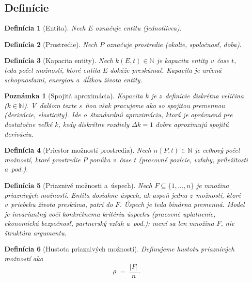 \documentclass[12pt,a4paper]{article}
\newtheorem{definition}{Definícia}[section]
\newtheorem{remark}{Poznámka}[section]
\begin{document}
\subsection{Definície}

\begin{definition}[Entita]
Nech $E$ označuje entitu (jednotlivca).
\end{definition}

\begin{definition}[Prostredie]
Nech $P$ označuje prostredie (okolie, spoločnosť, doba).
\end{definition}

\begin{definition}[Kapacita entity]
Nech $k(E, t) \in \mathbb{N}$ je \emph{kapacita entity} v~čase $t$, teda počet možností, ktoré entita $E$ dokáže preskúmať. Kapacita je určená schopnosťami, energiou a~dĺžkou života entity.
\end{definition}

\begin{remark}[Spojitá aproximácia]
Kapacita $k$ je z~definície diskrétna veličina ($k \in \mathbb{N}$). V~ďalšom texte s~ňou však pracujeme ako so spojitou premennou (derivácie, elasticity). Ide o~štandardnú aproximáciu, ktorá je oprávnená pre dostatočne veľké $k$, kedy diskrétne rozdiely $\Delta k = 1$ dobre aproximujú spojitú deriváciu.
\end{remark}

\begin{definition}[Priestor možností prostredia]
Nech $n(P, t) \in \mathbb{N}$ je celkový počet možností, ktoré prostredie $P$ ponúka v~čase $t$ (pracovné pozície, vzťahy, príležitosti a~pod.).
\end{definition}

\begin{definition}[Priaznivé možnosti a~úspech]
Nech $F \subseteq \{1, \dots, n\}$ je množina \emph{priaznivých možností}. Entita dosiahne \emph{úspech}, ak aspoň jedna z~možností, ktoré v~priebehu života preskúma, patrí do $F$. Úspech je teda binárna premenná. Model je invariantný voči konkrétnemu kritériu úspechu (pracovné uplatnenie, ekonomická bezpečnosť, partnerský vzťah a~pod.); mení sa len množina $F$, nie štruktúra argumentu.
\end{definition}

\begin{definition}[Hustota priaznivých možností]
Definujeme hustotu priaznivých možností ako
\begin{equation}
    \rho \;=\; \frac{|F|}{n}.
\end{equation}
\end{definition}
\end{document}
